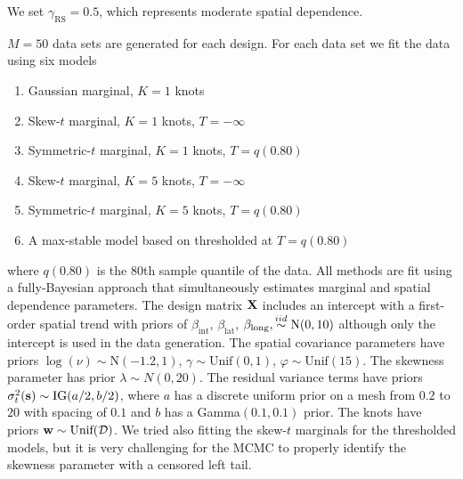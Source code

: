 \documentclass[useAMS,usenatbib,referee]{biom}
\begin{document}
We set $\gamma_{\text{RS}} = 0.5$, which represents moderate spatial dependence.

$M = 50$ data sets are generated for each design.
For each data set we fit the data using six models
\begin{enumerate}[leftmargin=3em]
  \item Gaussian marginal, $K=1$ knots
  \item Skew-$t$ marginal, $K=1$ knots, $T=-\infty$
  \item Symmetric-$t$ marginal, $K=1$ knots, $T=q(0.80)$
  \item Skew-$t$ marginal, $K=5$ knots, $T=-\infty$
  \item Symmetric-$t$ marginal, $K=5$ knots, $T=q(0.80)$
  \item A max-stable model based on \citet{Reich2012} thresholded at $T = q(0.80)$
\end{enumerate}
where $q(0.80)$ is the 80th sample quantile of the data.
All methods are fit using a fully-Bayesian approach that simultaneously estimates marginal and spatial dependence parameters.
The design matrix $\mbox{\bf X}$ includes an intercept with a first-order spatial trend with priors of $\beta_\text{int}$, $\beta_\text{lat}$, $\beta_\text{long},  \stackrel{iid}{\sim} \text{N}(0, 10)$ although only the intercept is used in the data generation.
The spatial covariance parameters have priors $\log(\nu) \sim \text{N}(-1.2, 1)$, $\gamma \sim \text{Unif}(0, 1)$, $\varphi \sim \text{Unif}(15)$.
The skewness parameter has prior $\lambda \sim N(0, 20)$.
The residual variance terms have priors $\sigma^2_t(\mbox{\bf s}) \sim \text{IG}(a / 2, b / 2)$, where $a$ has a discrete uniform prior on a mesh from $0.2$ to $20$ with spacing of $0.1$ and $b$ has a Gamma$(0.1, 0.1)$ prior.
The knots have priors $\bw \sim \text{Unif}(\calD)$.
We tried also fitting the skew-$t$ marginals for the thresholded models, but it is very challenging for the MCMC to properly identify the skewness parameter with a censored left tail.
\end{document}
